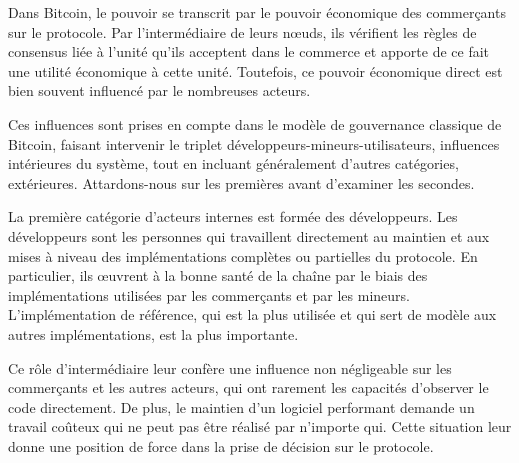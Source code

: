 Dans Bitcoin, le pouvoir se transcrit par le pouvoir économique des commerçants sur le protocole. Par l'intermédiaire de leurs nœuds, ils vérifient les règles de consensus liée à l'unité qu'ils acceptent dans le commerce et apporte de ce fait une utilité économique à cette unité. Toutefois, ce pouvoir économique direct est bien souvent influencé par le nombreuses acteurs.

Ces influences sont prises en compte dans le modèle de gouvernance classique de Bitcoin, faisant intervenir le triplet développeurs-mineurs-utilisateurs, influences intérieures du système, tout en incluant généralement d'autres catégories, extérieures. Attardons-nous sur les premières avant d'examiner les secondes.


La première catégorie d'acteurs internes est formée des développeurs. Les développeurs sont les personnes qui travaillent directement au maintien et aux mises à niveau des implémentations complètes ou partielles du protocole. En particulier, ils œuvrent à la bonne santé de la chaîne par le biais des implémentations utilisées par les commerçants et par les mineurs. L'implémentation de référence, qui est la plus utilisée et qui sert de modèle aux autres implémentations, est la plus importante.

Ce rôle d'intermédiaire leur confère une influence non négligeable sur les commerçants et les autres acteurs, qui ont rarement les capacités d'observer le code directement. De plus, le maintien d'un logiciel performant demande un travail coûteux qui ne peut pas être réalisé par n'importe qui. Cette situation leur donne une position de force dans la prise de décision sur le protocole.

